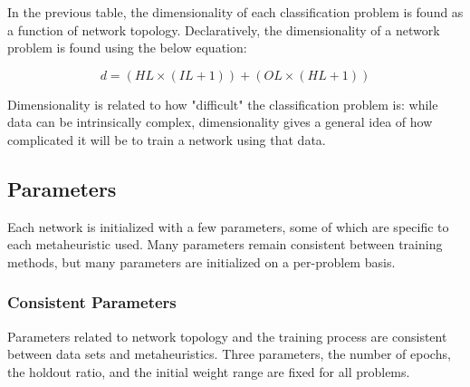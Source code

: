 \documentclass[a4paper,12pt]{article}
\begin{document}
\begin{table}[h!]
\centering
{}
\caption{Dimensionality of each problem.}
\label{Tab:dim-tab}
\end{table}

\pagebreak

In the previous table, the dimensionality of each classification problem is found as a function of network topology. Declaratively, the dimensionality of a network problem is found using the below equation:

$$d = (HL \times (IL + 1)) + (OL \times (HL + 1))$$

Dimensionality is related to how "difficult" the classification problem is: while data can be intrinsically complex, dimensionality gives a general idea of how complicated it will be to train a network using that data.

\subsection{Parameters}

Each network is initialized with a few parameters, some of which are specific to each metaheuristic used. Many parameters remain consistent between training methods, but many parameters are initialized on a per-problem basis.

\subsubsection{Consistent Parameters}

Parameters related to network topology and the training process are consistent between data sets and metaheuristics. Three parameters, the number of epochs, the holdout ratio, and the initial weight range are fixed for all problems.
\end{document}

